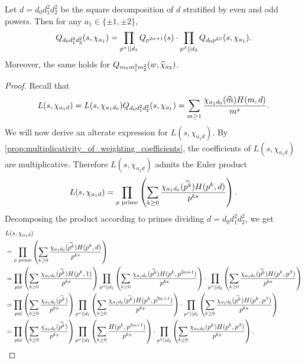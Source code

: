\documentclass[12pt,reqno,oneside]{amsart}
\begin{document}
    \begin{theorem}\label{thm:correction_polynomial_Euler_product}
        Let $d = d_{0}d_{1}^{2}d_{2}^{2}$ be the square decomposition of $d$ stratified by even and odd powers. Then for any $a_{1} \in \{\pm1,\pm2\}$,
        \[
            Q_{d_{0}d_{1}^{2}d_{2}^{2}}(s,\chi_{a_{1}}) = \prod_{p^{\alpha} \mid\mid d_{1}}Q_{p^{2\alpha+1}}(s) \cdot \prod_{p^{\beta} \mid\mid d_{2}}Q_{d_{0}p^{2\beta}}(s,\chi_{a_{1}}).
        \]
        Moreover, the same holds for $Q_{m_{0}m_{1}^{2}m_{2}^{2}}(w,\widetilde{\chi}
        _{a_{2}})$.
    \end{theorem}
    \begin{proof}
        Recall that
        \[
            L(s,\chi_{a_{1}d}) = L(s,\chi_{a_{1}d_{0}})Q_{d_{0}d_{1}^{2}d_{2}^{2}}(s,\chi_{a_{1}}) = \sum_{m \ge 1}\frac{\chi_{a_{1}d_{0}}(\widehat{m})H(m,d)}{m^{s}}.
        \]
        We will now derive an alterate expression for $L(s,\chi_{a_{1}d})$. By \cref{prop:multiplicativity_of_weighting_coefficients}, the coefficients of $L(s,\chi_{a_{1}d})$ are multiplicative. Therefore $L(s,\chi_{a_{1}d})$ admits the Euler product
        \[
            L(s,\chi_{a_{1}d}) = \prod_{\text{$p$ prime}}\left(\sum_{k \ge 0}\frac{\chi_{a_{1}d_{0}}(\widehat{p^{k}})H(p^{k},d)}{p^{ks}}\right).
        \]
        Decomposing the product according to primes dividing $d = d_{0}d_{1}^{2}d_{2}^{2}$, we get
        \begin{align*}
            & L(s,\chi_{a_{1}d}) \\
            &= \prod_{\text{$p$ prime}}\left(\sum_{k \ge 0}\frac{\chi_{a_{1}d_{0}}(\what{p^{k}})H(p^{k},d)}{p^{ks}}\right) \\
            &= \prod_{p \nmid d}\left(\sum_{k \ge 0}\frac{\chi_{a_{1}d_{0}}(\what{p^{k}})H(p^{k},1)}{p^{ks}}\right)\prod_{p^{\a} \mid\mid d_{1}}\left(\sum_{k \ge 0}\frac{\chi_{a_{1}d_{0}}(\what{p^{k}})H(p^{k},p^{2\a+1})}{p^{ks}}\right) \cdot \prod_{p^{\b} \mid\mid d_{2}}\left(\sum_{k \ge 0}\frac{\chi_{a_{1}d_{0}}(\what{p^{k}})H(p^{k},p^{\b})}{p^{ks}}\right) \\
            &= \prod_{p \nmid d}\left(\sum_{k \ge 0}\frac{\chi_{a_{1}d_{0}}(\what{p^{k}})}{p^{ks}}\right)\prod_{p^{\a} \mid\mid d_{1}}\left(\sum_{k \ge 0}\frac{\chi_{a_{1}d_{0}}(\what{p^{k}})H(p^{k},p^{2\a+1})}{p^{ks}}\right) \cdot \prod_{p^{\b} \mid\mid d_{2}}\left(\sum_{k \ge 0}\frac{\chi_{a_{1}d_{0}}(\what{p^{k}})H(p^{k},p^{\b})}{p^{ks}}\right) \\
            &= \prod_{p \nmid d}\left(\sum_{k \ge 0}\frac{\chi_{a_{1}d_{0}}(\what{p^{k}})}{p^{ks}}\right)\prod_{p^{\a} \mid\mid d_{1}}\left(\sum_{k \ge 0}\frac{H(p^{k},p^{2\a+1})}{p^{ks}}\right) \cdot \prod_{p^{\b} \mid\mid d_{2}}\left(\sum_{k \ge 0}\frac{\chi_{a_{1}d_{0}}(p^{k})H(p^{k},p^{\b})}{p^{ks}}\right).

\end{align*}
\end{proof}
\end{document}
